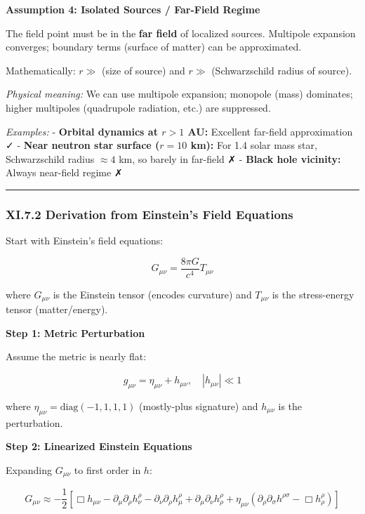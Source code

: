\documentclass[
]{article}
\begin{document}
\textbf{Assumption 4: Isolated Sources / Far-Field Regime}

The field point must be in the \textbf{far field} of localized sources.
Multipole expansion converges; boundary terms (surface of matter) can be
approximated.

Mathematically: \(r \gg\) (size of source) and \(r \gg\) (Schwarzschild
radius of source).

\emph{Physical meaning:} We can use multipole expansion; monopole (mass)
dominates; higher multipoles (quadrupole radiation, etc.) are
suppressed.

\emph{Examples:} - \textbf{Orbital dynamics at \(r > 1\) AU:} Excellent
far-field approximation ✓ - \textbf{Near neutron star surface
(\(r = 10\) km):} For 1.4 solar mass star, Schwarzschild radius
\(\approx 4\) km, so barely in far-field ✗ - \textbf{Black hole
vicinity:} Always near-field regime ✗

\begin{center}\rule{0.5\linewidth}{0.5pt}\end{center}

\subsubsection{XI.7.2 Derivation from Einstein's Field
Equations}\label{xi.7.2-derivation-from-einsteins-field-equations}

Start with Einstein's field equations:

\[G_{\mu\nu} = \frac{8\pi G}{c^4} T_{\mu\nu}\]

where \(G_{\mu\nu}\) is the Einstein tensor (encodes curvature) and
\(T_{\mu\nu}\) is the stress-energy tensor (matter/energy).

\textbf{Step 1: Metric Perturbation}

Assume the metric is nearly flat:

\[g_{\mu\nu} = \eta_{\mu\nu} + h_{\mu\nu}, \quad |h_{\mu\nu}| \ll 1\]

where \(\eta_{\mu\nu} = \text{diag}(-1, 1, 1, 1)\) (mostly-plus
signature) and \(h_{\mu\nu}\) is the perturbation.

\textbf{Step 2: Linearized Einstein Equations}

Expanding \(G_{\mu\nu}\) to first order in \(h\):

\[G_{\mu\nu} \approx -\frac{1}{2}\left[\Box h_{\mu\nu} - \partial_\mu \partial_\rho h^\rho_\nu - \partial_\nu \partial_\rho h^\rho_\mu + \partial_\mu \partial_\nu h^\rho_\rho + \eta_{\mu\nu}(\partial_\rho \partial_\sigma h^{\rho\sigma} - \Box h^\rho_\rho)\right]\]
\end{document}
